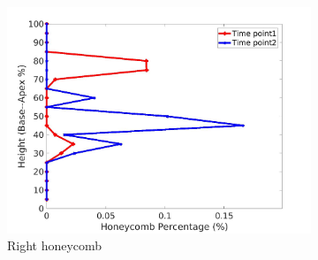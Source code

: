 \begin{figure}[H]
\begin{subfigure}{.42\linewidth}
  \includegraphics[width=\linewidth,trim={{.0\wd0} {.0\wd0} {.0\wd0} {.0\wd0}},clip]{Appendix/Image_AppexA/BaseToApex/IPF14RightLungHoneycombDiseaseAgainstHeight.jpg}
  \caption{Right honeycomb}
  \label{fig:IPF14DiseaseAgainstHeight-f}
\end{subfigure}
\begin{subfigure}{.42\linewidth}%

\end{subfigure}
\end{figure}
